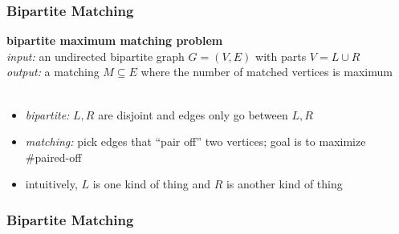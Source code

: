 \documentclass[10pt,aspectratio=169]{beamer}
\newcommand{\stanza}{ \\~\ }
\begin{document}
\begin{frame} \frametitle{Bipartite Matching}
\textbf{bipartite maximum matching problem} \\
\emph{input:} an undirected bipartite graph $G=(V, E)$ with parts $V=L \cup R$ \\
\emph{output:} a matching $M \subseteq E$ where the number of matched vertices
  is maximum \stanza

\begin{itemize}
  \item \emph{bipartite:} $L, R$ are disjoint and edges only go between $L, R$
  \item \emph{matching:} pick edges that ``pair off'' two vertices; goal is to
    maximize \#paired-off
  \item intuitively, $L$ is one kind of thing and $R$ is another kind of thing
\end{itemize}
\end{frame}

\begin{frame} \frametitle{Bipartite Matching}
\begin{center}
\end{center}
\end{frame}
\end{document}
